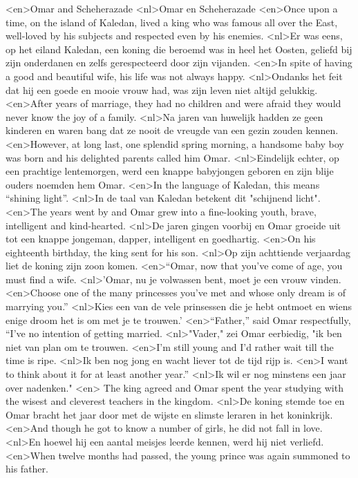 <en>Omar and Scheherazade
<nl>Omar en Scheherazade
<en>Once upon a time, on the island of Kaledan, lived a king who was famous all over the East, well-loved by his subjects and respected even by his enemies.
<nl>Er was eens, op het eiland Kaledan, een koning die beroemd was in heel het Oosten, geliefd bij zijn onderdanen en zelfs gerespecteerd door zijn vijanden.
<en>In spite of having a good and beautiful wife, his life was not always happy.
<nl>Ondanks het feit dat hij een goede en mooie vrouw had, was zijn leven niet altijd gelukkig.
<en>After years of marriage, they had no children and were afraid they would never know the joy of a family.
<nl>Na jaren van huwelijk hadden ze geen kinderen en waren bang dat ze nooit de vreugde van een gezin zouden kennen.
<en>However, at long last, one splendid spring morning, a handsome baby boy was born and his delighted parents called him Omar.
<nl>Eindelijk echter, op een prachtige lentemorgen, werd een knappe babyjongen geboren en zijn blije ouders noemden hem Omar.
<en>In the language of Kaledan, this means “shining light”.
<nl>In de taal van Kaledan betekent dit "schijnend licht".
<en>The years went by and Omar grew into a fine-looking youth, brave, intelligent and kind-hearted.
<nl>De jaren gingen voorbij en Omar groeide uit tot een knappe jongeman, dapper, intelligent en goedhartig.
<en>On his eighteenth birthday, the king sent for his son.
<nl>Op zijn achttiende verjaardag liet de koning zijn zoon komen.
<en>“Omar, now that you’ve come of age, you must find a wife.
<nl>'Omar, nu je volwassen bent, moet je een vrouw vinden.
<en>Choose one of the many princesses you’ve met and whose only dream is of marrying you.”
<nl>Kies een van de vele prinsessen die je hebt ontmoet en wiens enige droom het is om met je te trouwen.'
<en>“Father,” said Omar respectfully, “I’ve no intention of getting married.
<nl>"Vader," zei Omar eerbiedig, "ik ben niet van plan om te trouwen.
<en>I’m still young and I’d rather wait till the time is ripe.
<nl>Ik ben nog jong en wacht liever tot de tijd rijp is.
<en>I want to think about it for at least another year.”
<nl>Ik wil er nog minstens een jaar over nadenken."
<en> The king agreed and Omar spent the year studying with the wisest and cleverest teachers in the kingdom.
<nl>De koning stemde toe en Omar bracht het jaar door met de wijste en slimste leraren in het koninkrijk.
<en>And though he got to know a number of girls, he did not fall in love.
<nl>En hoewel hij een aantal meisjes leerde kennen, werd hij niet verliefd.
<en>When twelve months had passed, the young prince was again summoned to his father.
